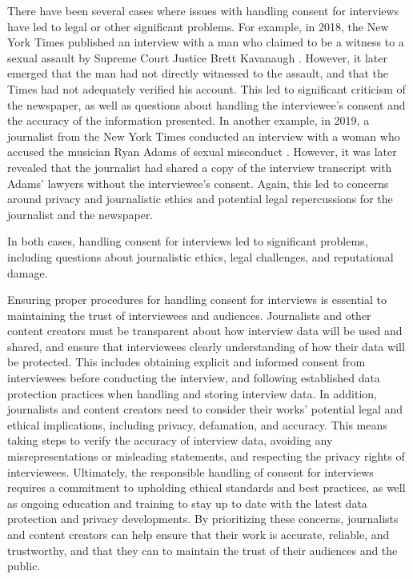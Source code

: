 \documentclass[target=mst,aauheader=]{thud}
\begin{document}
There have been several cases where issues with handling consent for interviews have led to legal or other significant problems. For example, in 2018, the New York Times published an interview with a man who claimed to be a witness to a sexual assault by Supreme Court Justice Brett Kavanaugh \cite{accusationBrettKavanaugh}. However, it later emerged that the man had not directly witnessed to the assault, and that the Times had not adequately verified his account. This led to significant criticism of the newspaper, as well as questions about handling the interviewee's consent and the accuracy of the information presented.
In another example, in 2019, a journalist from the New York Times conducted an interview with a woman who accused the musician Ryan Adams of sexual misconduct \cite{accusationRyanAdams}. However, it was later revealed that the journalist had shared a copy of the interview transcript with Adams' lawyers without the interviewee's consent. Again, this led to concerns around privacy and journalistic ethics and potential legal repercussions for the journalist and the newspaper.

In both cases, handling consent for interviews led to significant problems, including questions about journalistic ethics, legal challenges, and reputational damage.

Ensuring proper procedures for handling consent for interviews is essential to maintaining the trust of interviewees and audiences. Journalists and other content creators must be transparent about how interview data will be used and shared, and ensure that interviewees clearly understanding of how their data will be protected. This includes obtaining explicit and informed consent \cite{informedConsent} from interviewees before conducting the interview, and following established data protection practices when handling and storing interview data.
In addition, journalists and content creators need to consider their works' potential legal and ethical implications, including privacy, defamation, and accuracy. This means taking steps to verify the accuracy of interview data, avoiding any misrepresentations or misleading statements, and respecting the privacy rights of interviewees.
Ultimately, the responsible handling of consent for interviews requires a commitment to upholding ethical standards and best practices, as well as ongoing education and training to stay up to date with the latest data protection and privacy developments. By prioritizing these concerns, journalists and content creators can help ensure that their work is accurate, reliable, and trustworthy, and that they can to maintain the trust of their audiences and the public.
\end{document}
